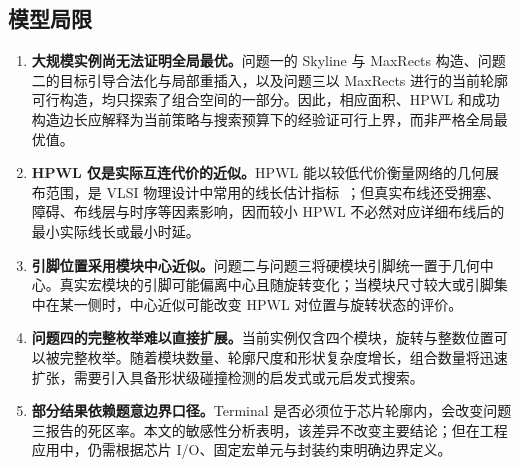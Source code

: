 \subsection{模型局限}
\begin{enumerate}[label=\arabic*.,leftmargin=2.4em,itemsep=0.35em]
  \item \textbf{大规模实例尚无法证明全局最优。}问题一的 Skyline 与 MaxRects 构造、问题二的目标引导合法化与局部重插入，以及问题三以 MaxRects 进行的当前轮廓可行构造，均只探索了组合空间的一部分。因此，相应面积、HPWL 和成功构造边长应解释为当前策略与搜索预算下的经验证可行上界，而非严格全局最优值。
  \item \textbf{HPWL 仅是实际互连代价的近似。}HPWL 能以较低代价衡量网络的几何展布范围，是 VLSI 物理设计中常用的线长估计指标~\cite{kahng2011}；但真实布线还受拥塞、障碍、布线层与时序等因素影响，因而较小 HPWL 不必然对应详细布线后的最小实际线长或最小时延。
  \item \textbf{引脚位置采用模块中心近似。}问题二与问题三将硬模块引脚统一置于几何中心。真实宏模块的引脚可能偏离中心且随旋转变化；当模块尺寸较大或引脚集中在某一侧时，中心近似可能改变 HPWL 对位置与旋转状态的评价。
  \item \textbf{问题四的完整枚举难以直接扩展。}当前实例仅含四个模块，旋转与整数位置可以被完整枚举。随着模块数量、轮廓尺度和形状复杂度增长，组合数量将迅速扩张，需要引入具备形状级碰撞检测的启发式或元启发式搜索。
  \item \textbf{部分结果依赖题意边界口径。}Terminal 是否必须位于芯片轮廓内，会改变问题三报告的死区率。本文的敏感性分析表明，该差异不改变主要结论；但在工程应用中，仍需根据芯片 I/O、固定宏单元与封装约束明确边界定义。
\end{enumerate}

